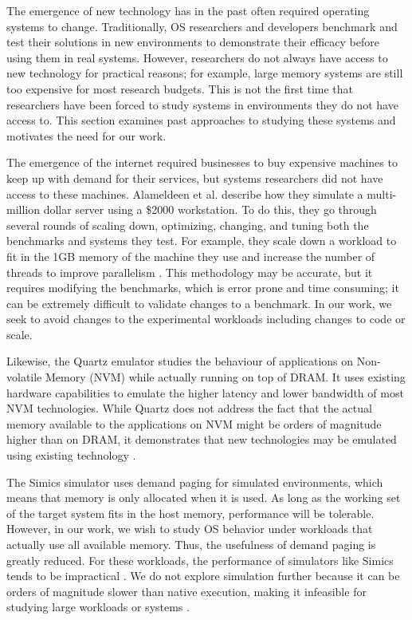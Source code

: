 \documentclass[twocolumn,11pt]{article}
\begin{document}
The emergence of new technology has in the past often required operating systems
to change. Traditionally, OS researchers and developers benchmark and test their
solutions in new environments to demonstrate their efficacy before using them in
real systems. However, researchers do not always have access to new technology
for practical reasons; for example, large memory systems are still too expensive
for most research budgets. This is not the first time that researchers have been
forced to study systems in environments they do not have access to. This section
examines past approaches to studying these systems and motivates the need for
our work.

The emergence of the internet required businesses to buy expensive machines to
keep up with demand for their services, but systems researchers did not have
access to these machines. Alameldeen et al. describe how they simulate a
multi-million dollar server using a \$2000 workstation. To do this, they go
through several rounds of scaling down, optimizing, changing, and tuning both
the benchmarks and systems they test. For example, they scale down a workload to
fit in the 1GB memory of the machine they use and increase the number of threads
to improve parallelism \cite{2kmachine}. This methodology may be accurate, but
it requires modifying the benchmarks, which is error prone and time consuming;
it can be extremely difficult to validate changes to a benchmark. In our work,
we seek to avoid changes to the experimental workloads including changes to code
or scale.

Likewise, the Quartz emulator studies the behaviour of applications on
Non-volatile Memory (NVM) while actually running on top of DRAM. It uses
existing hardware capabilities to emulate the higher latency and lower bandwidth
of most NVM technologies. While Quartz does not address the fact that the actual
memory available to the applications on NVM might be orders of magnitude higher
than on DRAM, it demonstrates that new technologies may be emulated using
existing technology \cite{quartz}.

The Simics simulator uses demand paging for simulated environments, which means
that memory is only allocated when it is used. As long as the working set of the
target system fits in the host memory, performance will be tolerable.  However,
in our work, we wish to study OS behavior under workloads that actually use all
available memory. Thus, the usefulness of demand paging is greatly reduced. For
these workloads, the performance of simulators like Simics tends to be
impractical \cite{simics}. We do not explore simulation further because it can
be orders of magnitude slower than native execution, making it infeasible for
studying large workloads or systems \cite{2kmachine}.
\end{document}
